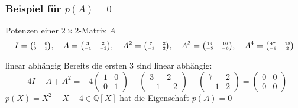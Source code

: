 %
%
%
\begin{frame}[t]
\frametitle{Beispiel für $p(A)=0$}
\begin{block}{Potenzen einer $2\times 2$-Matrix $A$}
\setlength{\abovedisplayskip}{5pt}
\setlength{\belowdisplayskip}{5pt}
\vspace{-10pt}
\[
I  ={\tiny\begin{pmatrix}  1 &  0 \\  0 &  1 \end{pmatrix}},\quad
A  ={\tiny\begin{pmatrix}  3 &  2 \\ -1 & -2 \end{pmatrix}},\quad
A^2={\tiny\begin{pmatrix}  7 &  2 \\ -1 &  2 \end{pmatrix}},\quad
A^3={\tiny\begin{pmatrix} 19 & 10 \\ -5 & -6 \end{pmatrix}},\quad
A^4={\tiny\begin{pmatrix} 47 & 18 \\ -9 &  2 \end{pmatrix}}
\]
\end{block}
\vspace{-5pt}
\begin{block}{linear abhängig}
Bereits die ersten $3$ sind linear abhängig:
\[
-4I - A + A^2
=
-4\begin{pmatrix}  1 &  0 \\  0 &  1 \end{pmatrix}
-\begin{pmatrix}  3 &  2 \\ -1 & -2 \end{pmatrix}
+\begin{pmatrix}  7 &  2 \\ -1 &  2 \end{pmatrix}
= 
\begin{pmatrix} 0 & 0 \\ 0 & 0 \end{pmatrix}
\]
$p(X) = X^2 - X - 4 \in \mathbb{Q}[X]$ hat die Eigenschaft $p(A)=0$
\end{block}
\end{frame}
